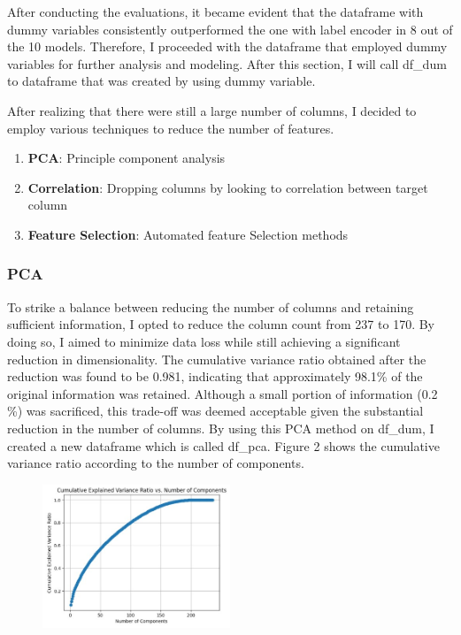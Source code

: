 After conducting the evaluations, it became evident that the dataframe with dummy variables consistently outperformed the one with label encoder in 8 out of the 10 models. Therefore, I proceeded with the dataframe that employed dummy variables for further analysis and modeling. After this section, I will call df\_dum to dataframe that was created by using dummy variable.  

After realizing that there were still a large number of columns, I decided to employ various techniques to reduce the number of features.
\begin{enumerate}[]
  \item \textbf{PCA}: Principle component analysis
  \item \textbf{Correlation}: Dropping columns by looking to correlation between target column
\item \textbf{Feature Selection}: Automated feature Selection methods
\end{enumerate}
\subsubsection{PCA}

To strike a balance between reducing the number of columns and retaining sufficient information, I opted to reduce the column count from 237 to 170. By doing so, I aimed to minimize data loss while still achieving a significant reduction in dimensionality. The cumulative variance ratio obtained after the reduction was found to be 0.981, indicating that approximately 98.1\% of the original information was retained. Although a small portion of information (0.2 \%) was sacrificed, this trade-off was deemed acceptable given the substantial reduction in the number of columns. By using this PCA method on df\_dum, I created a new dataframe which is called df\_pca. Figure 2 shows the cumulative variance ratio according to the number of components.

\begin{figure}[H]
  \centering
  \includegraphics[width=0.5\textwidth]{./fig/cumulative.jpg}
  \label{fig:corr1}
  \caption{}
\end{figure}
